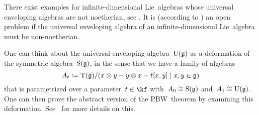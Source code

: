 \begin{remark}
  There exist examples for infinite-dimensional Lie~algebras whose universal enveloping algebras are not noetherian, see \cite{uea_of_witt_algebra_not_noetherian}.
  It is (according to \cite[p.\ xix]{introduction_to_noncommutative_noetherian}) an open problem if the universal enveloping algebra of an infinite-dimensional Lie~algebra must be non-noetherian.
\end{remark}


\begin{remark}
  One can think about the universal enveloping algebra~$\operatorname{U}(\mathfrak{g})$ as a deformation of the symmetric algebra~$\operatorname{S}(\mathfrak{g})$, in the sense that we have a family of algebras
  \[
    A_t
    \defined
    \Tensor(\glie)/(x \tensor y - y \tensor x - t[x,y] \suchthat x, y \in \glie)
  \]
  that is parametrized over a parameter~$t \in \kf$ with~$A_0 \cong \operatorname{S}(\mathfrak{g})$ and~$A_1 \cong \operatorname{U}(\mathfrak{g})$.
  One can then prove the abstract version of the PBW~theorem by examining this deformation.
  See~\cite{pbw_deformation} for more details on this.
\end{remark}





